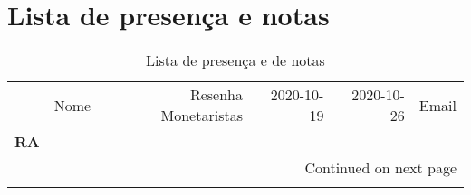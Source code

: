 \documentclass[11pt]{article}
\begin{document}
\section{Lista de presença e notas}
\label{sec:org06d9173}
\begin{center}\begin{landscape}
\small
\setlength\LTleft{0pt}
\setlength\LTright{0pt}
\begin{longtable}{llrrrl}
\caption{Lista de presença e de notas}\label{lista}\\
\toprule
{} &                                  Nome &  Resenha Monetaristas &  2020-10-19 &  2020-10-26 &                   Email \\
\textbf{RA    } &                                       &                       &             &             &                         \\
\midrule
\endhead
\midrule
\multicolumn{6}{r}{{Continued on next page}} \\
\midrule
\endfoot


\end{longtable}
\end{landscape}
\end{center}
\end{document}
